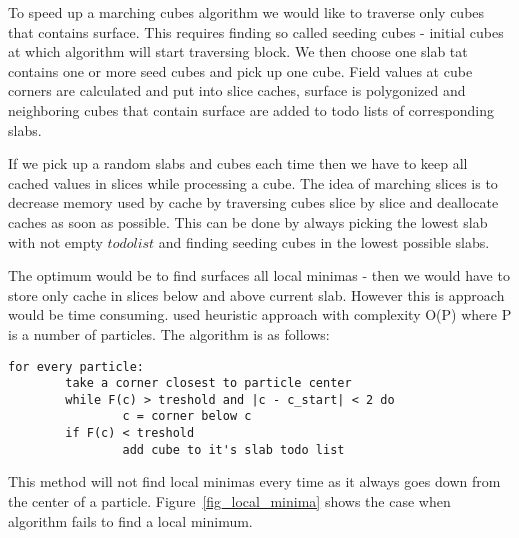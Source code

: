 
To speed up a marching cubes algorithm we would like to traverse only cubes that contains surface. This requires finding so called seeding cubes - initial cubes at which algorithm will start traversing block. We then choose one slab tat contains one or more seed cubes and pick up one cube. Field values at cube corners are calculated and put into slice caches, surface is polygonized and neighboring cubes that contain surface are added to todo lists of corresponding slabs. 

If we pick up a random slabs and cubes each time then we have to keep all cached values in slices while processing a cube. The idea of marching slices is to decrease memory used by cache by traversing cubes slice by slice and deallocate caches as soon as possible. This can be done by always picking the lowest slab with not empty $todo list$ and finding seeding cubes in the lowest possible slabs. 

The optimum would be to find surfaces all local minimas - then we would have to store only cache in slices below and above current slab. However this is approach would be time consuming. \cite{RosenbergBirdwell2008} used heuristic approach with complexity O(P) where P is a number of particles. The algorithm is as follows:
\begin{verbatim}
for every particle:
        take a corner closest to particle center
        while F(c) > treshold and |c - c_start| < 2 do
                c = corner below c
        if F(c) < treshold
                add cube to it's slab todo list
\end{verbatim}

This method will not find local minimas every time as it always goes down from the center of a particle. Figure~\ref{fig_local_minima} shows the case when algorithm fails to find a local minimum. 


